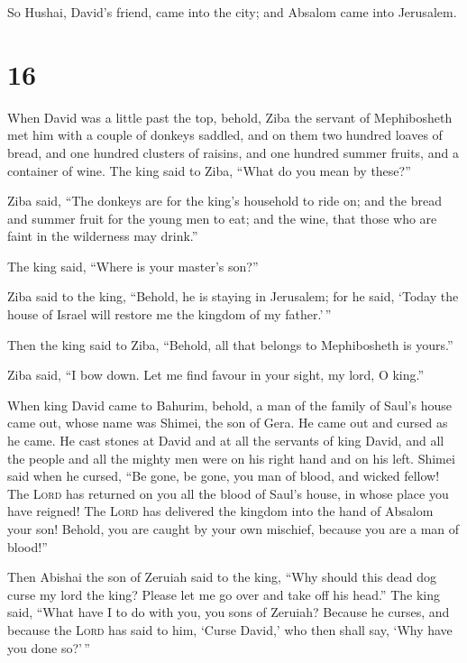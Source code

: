  So Hushai, David's friend, came into the city; and
Absalom came into Jerusalem.

\hypertarget{section-15}{%
\section{16}\label{section-15}}

 When David was a little past the top, behold, Ziba the
servant of Mephibosheth met him with a couple of donkeys saddled, and on
them two hundred loaves of bread, and one hundred clusters of raisins,
and one hundred summer fruits, and a container of wine. 
The king said to Ziba, ``What do you mean by these?''

Ziba said, ``The donkeys are for the king's household to ride on; and
the bread and summer fruit for the young men to eat; and the wine, that
those who are faint in the wilderness may drink.''

 The king said, ``Where is your master's son?''

Ziba said to the king, ``Behold, he is staying in Jerusalem; for he
said, `Today the house of Israel will restore me the kingdom of my
father.'\,''

 Then the king said to Ziba, ``Behold, all that belongs to
Mephibosheth is yours.''

Ziba said, ``I bow down. Let me find favour in your sight, my lord, O
king.''

 When king David came to Bahurim, behold, a man of the
family of Saul's house came out, whose name was Shimei, the son of Gera.
He came out and cursed as he came.  He cast stones at
David and at all the servants of king David, and all the people and all
the mighty men were on his right hand and on his left. 
Shimei said when he cursed, ``Be gone, be gone, you man of blood, and
wicked fellow!  The \textsc{Lord} has returned on you all
the blood of Saul's house, in whose place you have reigned! The
\textsc{Lord} has delivered the kingdom into the hand of Absalom your
son! Behold, you are caught by your own mischief, because you are a man
of blood!''

 Then Abishai the son of Zeruiah said to the king, ``Why
should this dead dog curse my lord the king? Please let me go over and
take off his head.''  The king said, ``What have I to do
with you, you sons of Zeruiah? Because he curses, and because the
\textsc{Lord} has said to him, `Curse David,' who then shall say, `Why
have you done so?'\,''

